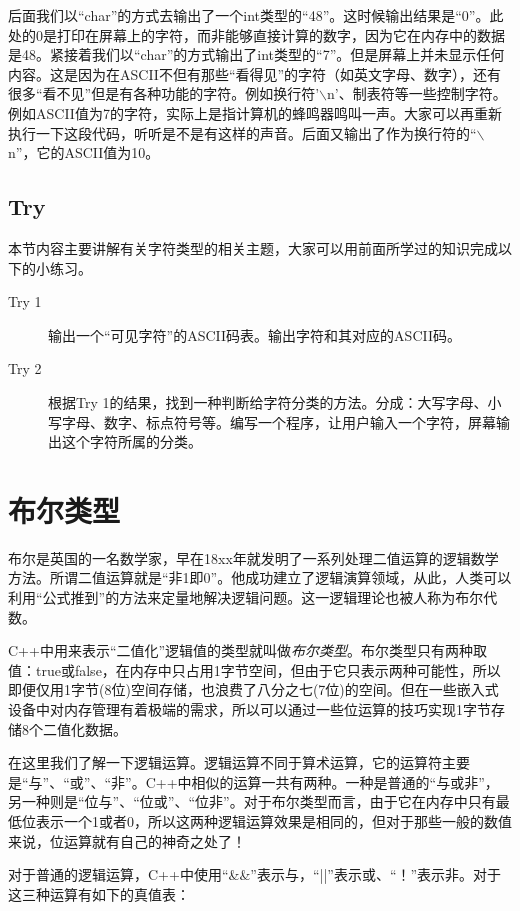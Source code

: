 后面我们以“char”的方式去输出了一个int类型的“48”。这时候输出结果是“0”。此处的0是打印在屏幕上的字符，而非能够直接计算的数字，因为它在内存中的数据是48。紧接着我们以“char”的方式输出了int类型的“7”。但是屏幕上并未显示任何内容。这是因为在ASCII不但有那些“看得见”的字符（如英文字母、数字），还有很多“看不见”但是有各种功能的字符。例如换行符'$\backslash$n'、制表符等一些控制字符。例如ASCII值为7的字符，实际上是指计算机的蜂鸣器鸣叫一声。大家可以再重新执行一下这段代码，听听是不是有这样的声音。后面又输出了作为换行符的“$\backslash$n”，它的ASCII值为10。

\subsection{Try}

本节内容主要讲解有关字符类型的相关主题，大家可以用前面所学过的知识完成以下的小练习。

\begin{description}
	\item[Try 1]输出一个“可见字符”的ASCII码表。输出字符和其对应的ASCII码。
	\item[Try 2]根据Try 1的结果，找到一种判断给字符分类的方法。分成：大写字母、小写字母、数字、标点符号等。编写一个程序，让用户输入一个字符，屏幕输出这个字符所属的分类。
\end{description}

\section{布尔类型}
布尔是英国的一名数学家，早在18xx年就发明了一系列处理二值运算的逻辑数学方法。所谓二值运算就是“非1即0”。他成功建立了逻辑演算领域，从此，人类可以利用“公式推到”的方法来定量地解决逻辑问题。这一逻辑理论也被人称为布尔代数。

C++中用来表示“二值化”逻辑值的类型就叫做\emph{布尔类型}。布尔类型只有两种取值：true或false，在内存中只占用1字节空间，但由于它只表示两种可能性，所以即便仅用1字节(8位)空间存储，也浪费了八分之七(7位)的空间。但在一些嵌入式设备中对内存管理有着极端的需求，所以可以通过一些位运算的技巧实现1字节存储8个二值化数据。

在这里我们了解一下逻辑运算。逻辑运算不同于算术运算，它的运算符主要是“与”、“或”、“非”。C++中相似的运算一共有两种。一种是普通的“与或非”，另一种则是“位与”、“位或”、“位非”。对于布尔类型而言，由于它在内存中只有最低位表示一个1或者0，所以这两种逻辑运算效果是相同的，但对于那些一般的数值来说，位运算就有自己的神奇之处了！

对于普通的逻辑运算，C++中使用“\&\&”表示与，“||”表示或、“！”表示非。对于这三种运算有如下的真值表：

